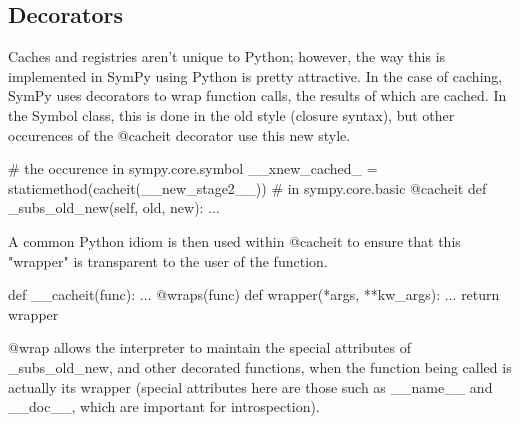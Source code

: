 \documentclass[11pt,a4paper,oneside]{report}
\begin{document}
\subsection*{Decorators}
Caches and registries aren't unique to Python; however, the way this is implemented in SymPy using Python is pretty attractive. In the case of caching, SymPy uses decorators to wrap function calls, the results of which are cached. In the Symbol class, this is done in the old style (closure syntax), but other occurences of the @cacheit decorator use this new style. 
\begin{verbatimtab}
# the occurence in sympy.core.symbol
__xnew_cached_ = staticmethod(cacheit(__new_stage2__))
# in sympy.core.basic
@cacheit
def _subs_old_new(self, old, new):
	...
\end{verbatimtab}
A common Python idiom is then used within @cacheit to ensure that this "wrapper" is transparent to the user of the function.
\begin{verbatimtab}
def __cacheit(func):
	...
	@wraps(func)
    def wrapper(*args, **kw_args):
    	...
    return wrapper
\end{verbatimtab}
@wrap allows the interpreter to maintain the special attributes of \_subs\_old\_new, and other decorated functions, when the function being called is actually its wrapper (special attributes here are those such as \_\_name\_\_ and \_\_doc\_\_, which are important for introspection).
\end{document}
